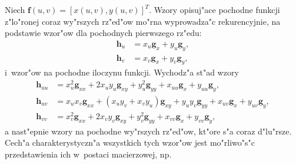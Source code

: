 Niech $\bm{f}(u,v)=[x(u,v),y(u,v)]^T$.
Wzory opisuj"ace pochodne funkcji z"lo"ronej coraz wy"rszych rz"ed"ow
mo"rna wyprowadza"c rekurencyjnie, na podstawie wzor"ow dla pochodnych
pierwszego rz"edu:
\begin{align*}
  \bm{h}_u &{}= x_u\bm{g}_x + y_u\bm{g}_y, \\
  \bm{h}_v &{}= x_v\bm{g}_x + y_v\bm{g}_y,
\end{align*}
i~wzor"ow na pochodne iloczynu funkcji. Wychodz"a st"ad wzory
\begin{align*}
  \bm{h}_{uu} &{}= x_u^2\bm{g}_{xx} + 2x_uy_u\bm{g}_{xy} + y_u^2\bm{g}_{yy} +
              x_{uu}\bm{g}_x + y_{uu}\bm{g}_y, \\
  \bm{h}_{uv} &{}= x_ux_v\bm{g}_{xx} + (x_uy_v+x_vy_u)\bm{g}_{xy} + y_uy_v\bm{g}_{yy} +
              x_{uv}\bm{g}_x + y_{uv}\bm{g}_y, \\
  \bm{h}_{vv} &{}= x_v^2\bm{g}_{xx} + 2x_vy_v\bm{g}_{xy} + y_v^2\bm{g}_{yy} +
              x_{vv}\bm{g}_x + y_{vv}\bm{g}_y,
\end{align*}
a nast"epnie wzory na pochodne wy"rszych rz"ed"ow, kt"ore s"a coraz d"lu"rsze.
Cech"a charakterystyczn"a wszystkich tych wzor"ow jest mo"rliwo"s"c
przedstawienia ich w~postaci macierzowej, np.
